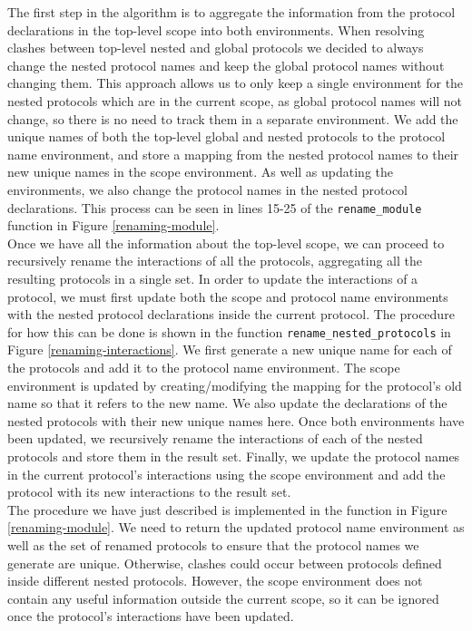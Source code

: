 \documentclass[12pt,twoside]{report}
\begin{document}
The first step in the algorithm is to aggregate the information from the protocol declarations in the top-level scope into both environments. When resolving clashes between top-level nested and global protocols we decided to always change the nested protocol names and keep the global protocol names without changing them. This approach allows us to only keep a single environment for the nested protocols which are in the current scope, as global protocol names will not change, so there is no need to track them in a separate environment. We add the unique names of both the top-level global and nested protocols to the protocol name environment, and store a mapping from the nested protocol names to their new unique names in the scope environment. As well as updating the environments, we also change the protocol names in the nested protocol declarations. This process can be seen in lines 15-25 of the \texttt{rename\_module} function in Figure \ref{renaming-module}.\\

Once we have all the information about the top-level scope, we can proceed to recursively rename the interactions of all the protocols, aggregating all the resulting protocols in a single set. In order to update the interactions of a protocol, we must first update both the scope and protocol name environments with the nested protocol declarations inside the current protocol. The procedure for how this can be done is shown in the function \texttt{rename\_nested\_protocols} in Figure \ref{renaming-interactions}. We first generate a new unique name for each of the protocols and add it to the protocol name environment. The scope environment is updated by creating/modifying the mapping for the protocol's old name so that it refers to the new name. We also update the declarations of the nested protocols with their new unique names here. Once both environments have been updated, we recursively rename the interactions of each of the nested protocols and store them in the result set. Finally, we update the protocol names in the current protocol's interactions using the scope environment and add the protocol with its new interactions to the result set.\\
 
The procedure we have just described is implemented in the \texttt{} function in Figure \ref{renaming-module}. We need to return the updated protocol name environment as well as the set of renamed protocols to ensure that the protocol names we generate are unique. Otherwise, clashes could occur between protocols defined inside different nested protocols. However, the scope environment does not contain any useful information outside the current scope, so it can be ignored once the protocol's interactions have been updated. \\
\end{document}
